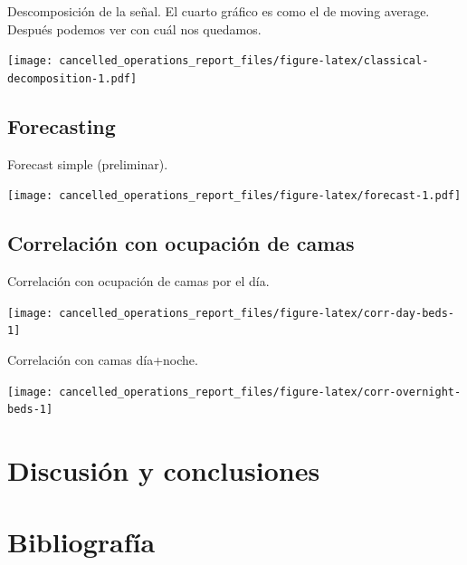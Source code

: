 \documentclass[
]{article}
\begin{document}
Descomposición de la señal. El cuarto gráfico es como el de moving
average. Después podemos ver con cuál nos quedamos.

\texttt{[image: cancelled\_operations\_report\_files/figure-latex/classical-decomposition-1.pdf]}

\hypertarget{forecasting}{%
\subsection{Forecasting}\label{forecasting}}

Forecast simple (preliminar).

\texttt{[image: cancelled\_operations\_report\_files/figure-latex/forecast-1.pdf]}

\hypertarget{correlaciuxf3n-con-ocupaciuxf3n-de-camas}{%
\subsection{Correlación con ocupación de
camas}\label{correlaciuxf3n-con-ocupaciuxf3n-de-camas}}

Correlación con ocupación de camas por el día.

\begin{center}\texttt{[image: cancelled\_operations\_report\_files/figure-latex/corr-day-beds-1]} \end{center}

Correlación con camas día+noche.

\begin{center}\texttt{[image: cancelled\_operations\_report\_files/figure-latex/corr-overnight-beds-1]} \end{center}

\hypertarget{discusiuxf3n-y-conclusiones}{%
\section{Discusión y conclusiones}\label{discusiuxf3n-y-conclusiones}}

\hypertarget{bibliografuxeda}{%
\section{Bibliografía}\label{bibliografuxeda}}
\end{document}
